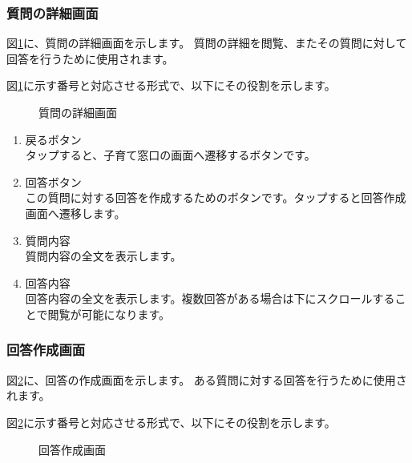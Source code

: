 \documentclass[a4j]{jarticle}
\begin{document}
\subsubsection{質問の詳細画面}
図\ref{honjo_CR_Answer}に、質問の詳細画面を示します。
質問の詳細を閲覧、またその質問に対して回答を行うために使用されます。

図\ref{honjo_CR_Answer}に示す番号と対応させる形式で、以下にその役割を示します。

\begin{figure}[H]
    \begin{center}
    \caption {質問の詳細画面}
    \label{honjo_CR_Answer}
    \end{center}
\end{figure}

\begin{enumerate}
  \renewcommand{\labelenumi}{\textcircled{\scriptsize \theenumi}}
  \item 戻るボタン\\
        タップすると、子育て窓口の画面へ遷移するボタンです。
  \item 回答ボタン\\
        この質問に対する回答を作成するためのボタンです。タップすると回答作成画面へ遷移します。
  \item 質問内容\\
        質問内容の全文を表示します。
  \item 回答内容\\
        回答内容の全文を表示します。複数回答がある場合は下にスクロールすることで閲覧が可能になります。
\end{enumerate}


\subsubsection{回答作成画面}
図\ref{honjo_CR_CreateAnswer}に、回答の作成画面を示します。
ある質問に対する回答を行うために使用されます。

図\ref{honjo_CR_CreateAnswer}に示す番号と対応させる形式で、以下にその役割を示します。

\begin{figure}[H]
    \begin{center}
    \caption {回答作成画面}
    \label{honjo_CR_CreateAnswer}
    \end{center}
\end{figure}
\end{document}
